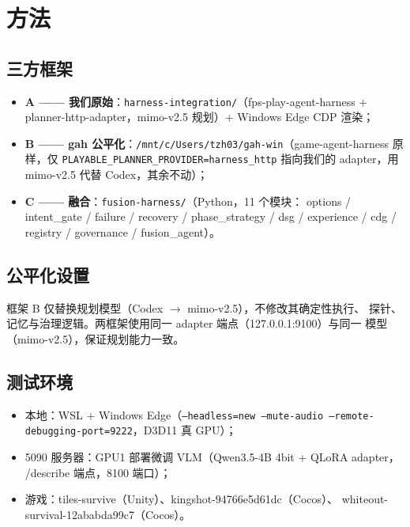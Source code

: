 \documentclass[11pt,a4paper]{article}
\begin{document}
\section{方法}

\subsection{三方框架}
\begin{itemize}[leftmargin=1.5em]
  \item \textbf{A —— 我们原始}：\texttt{harness-integration/}（fps-play-agent-harness
        + planner-http-adapter，mimo-v2.5 规划）+ Windows Edge CDP 渲染；
  \item \textbf{B —— gah 公平化}：\texttt{/mnt/c/Users/tzh03/gah-win}（game-agent-harness
        原样，仅 \texttt{PLAYABLE\_PLANNER\_PROVIDER=harness\_http} 指向我们的
        adapter，用 mimo-v2.5 代替 Codex，其余不动）；
  \item \textbf{C —— 融合}：\texttt{fusion-harness/}（Python，11 个模块：
        options / intent\_gate / failure / recovery / phase\_strategy / dsg /
        experience / cdg / registry / governance / fusion\_agent）。
\end{itemize}

\subsection{公平化设置}
框架 B 仅替换规划模型（Codex $\rightarrow$ mimo-v2.5），不修改其确定性执行、
探针、记忆与治理逻辑。两框架使用同一 adapter 端点（127.0.0.1:9100）与同一
模型（mimo-v2.5），保证规划能力一致。

\subsection{测试环境}
\begin{itemize}[leftmargin=1.5em]
  \item 本地：WSL + Windows Edge（\texttt{--headless=new --mute-audio
        --remote-debugging-port=9222}，D3D11 真 GPU）；
  \item 5090 服务器：GPU1 部署微调 VLM（Qwen3.5-4B 4bit + QLoRA adapter，
        /describe 端点，8100 端口）；
  \item 游戏：tiles-survive（Unity）、kingshot-94766e5d61dc（Cocos）、
        whiteout-survival-12ababda99c7（Cocos）。
\end{itemize}
\end{document}
